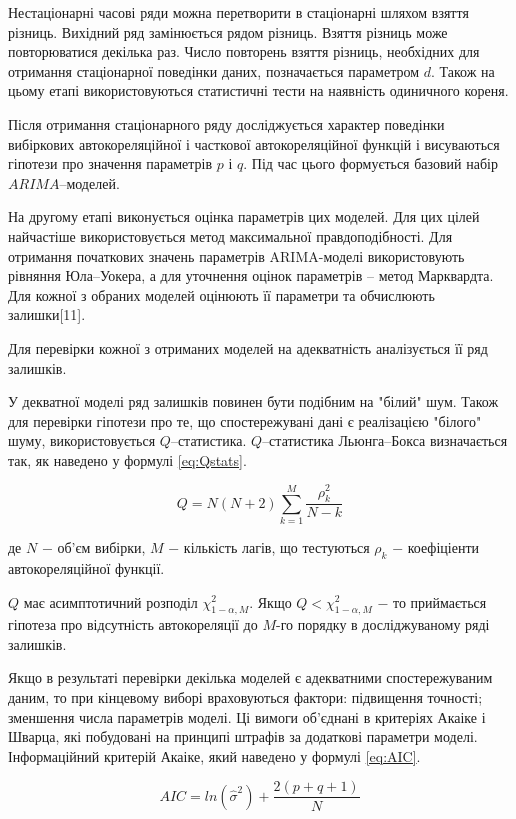 Нестаціонарні часові ряди можна перетворити в стаціонарні шляхом взяття різниць. Вихідний ряд замінюється рядом різниць. Взяття різниць може повторюватися декілька раз. Число повторень взяття різниць, необхідних для отримання стаціонарної поведінки даних, позначається параметром $d$. Також на цьому етапі використовуються статистичні тести на наявність одиничного кореня.

Після отримання стаціонарного ряду досліджується характер поведінки вибіркових автокореляційної і часткової автокореляційної функцій і висуваються гіпотези про значення параметрів $p$ і $q$. Під час цього формується базовий набір $ARIMA$–моделей.

На другому етапі виконується оцінка параметрів цих моделей. Для цих цілей найчастіше використовується метод максимальної правдоподібності. Для отримання початкових значень параметрів ARIMA-моделі використовують рівняння Юла–Уокера, а для уточнення оцінок параметрів – метод Марквардта. Для кожної з обраних моделей оцінюють її параметри та обчислюють залишки[11]. 

Для перевірки кожної з отриманих моделей на адекватність аналізується її ряд залишків. 

У декватної моделі ряд залишків повинен бути подібним на "білий" шум. Також для перевірки гіпотези про те, що спостережувані дані є реалізацією "білого" шуму, використовується $Q$–статистика. $Q$–статистика Льюнга–Бокса визначається так, як наведено у формулі \ref{eq:Qstats}.

\begin{equation}\label{eq:Qstats}
Q = N(N+2)\sum_{k=1}^{M}\frac{\rho_{k}^{2}}{N-k}
\end{equation}

\noindent де $N$ $-$ об’єм вибірки, $M$ $-$ кількість лагів, що тестуються $\rho_{k}$ $-$ коефіціенти автокореляційної функції. 

$Q$ має асимптотичний розподіл $\chi^{2}_{1-\alpha, M}$. Якщо $Q < \chi^{2}_{1-\alpha,M}$ $-$ то приймається гіпотеза про відсутність автокореляції до $M$-го порядку в досліджуваному ряді залишків.

Якщо в результаті перевірки декілька моделей є адекватними спостережуваним даним, то при кінцевому виборі враховуються фактори: підвищення точності; зменшення числа параметрів моделі. Ці вимоги об’єднані в критеріях Акаіке і Шварца, які побудовані на принципі штрафів за додаткові параметри моделі. Інформаційний критерій Акаіке, який наведено у формулі \ref{eq:AIC}.

\begin{equation}\label{eq:AIC}
AIC = ln(\hat{\sigma}^{2}) + \frac{2(p+q+1)}{N}
\end{equation}

